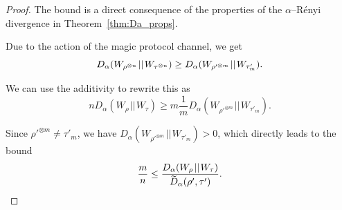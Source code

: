\documentclass[pra,
aps,
twocolumn,
superscriptaddress,
groupedaddress,
nofootinbib,
reprint
]{revtex4-1}
\begin{document}
\begin{proof}
	The bound is a direct consequence of the properties of the $\alpha$--R\'{e}nyi divergence in Theorem~\ref{thm:Da_props}.
	
Due to the action of the magic protocol channel, we get
\begin{equation}	
	D_\alpha(W_{\rho^{\otimes n}} \hspace{1pt}||\hspace{1pt} W_{\tau^{\otimes n}}) \geq D_\alpha (W_{\rho'^{\otimes m}} \hspace{1pt}||\hspace{1pt} W_{\tau'_m}).\vspace{10pt}
\end{equation}

We can use the additivity to rewrite this as
\begin{equation}
	n D_\alpha(W_\rho \hspace{1pt}||\hspace{1pt} W_\tau) \geq m \frac{1}{m}D_\alpha(W_{\rho'^{\otimes m}} \hspace{1pt}||\hspace{1pt} W_{\tau'_m}).
\end{equation}

Since $\rho'^{\otimes m} \neq \tau'_m$, we have $D_\alpha(W_{\rho'^{\otimes m}} \hspace{1pt}||\hspace{1pt} W_{\tau'_m}) > 0$, which directly leads to the bound
\begin{equation}
	\frac{m}{n} \leq \frac{D_{\alpha}(W_\rho \hspace{1pt}||\hspace{1pt} W_\tau)}{\rlap{\raisebox{-0.1ex}{$\widetilde{\phantom{D}}$}}D_\alpha( \rho', \tau')}.
\end{equation}
\end{proof}
\end{document}

